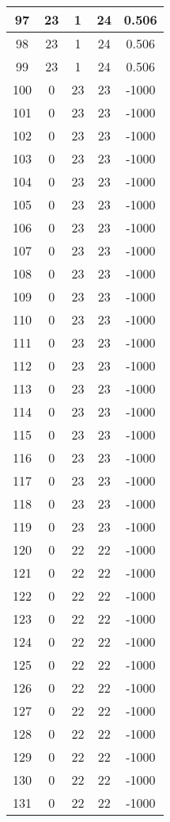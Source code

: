 \documentclass[letterpaper, 12pt]{article}
\begin{document}
\begin{longtable}{|c|c|c|c|c|}
\hline
97 & 23 & 1 & 24 & 0.506 \\
\hline
98 & 23 & 1 & 24 & 0.506 \\
\hline
99 & 23 & 1 & 24 & 0.506 \\
\hline
100 & 0 & 23 & 23 & -1000 \\
\hline
101 & 0 & 23 & 23 & -1000 \\
\hline
102 & 0 & 23 & 23 & -1000 \\
\hline
103 & 0 & 23 & 23 & -1000 \\
\hline
104 & 0 & 23 & 23 & -1000 \\
\hline
105 & 0 & 23 & 23 & -1000 \\
\hline
106 & 0 & 23 & 23 & -1000 \\
\hline
107 & 0 & 23 & 23 & -1000 \\
\hline
108 & 0 & 23 & 23 & -1000 \\
\hline
109 & 0 & 23 & 23 & -1000 \\
\hline
110 & 0 & 23 & 23 & -1000 \\
\hline
111 & 0 & 23 & 23 & -1000 \\
\hline
112 & 0 & 23 & 23 & -1000 \\
\hline
113 & 0 & 23 & 23 & -1000 \\
\hline
114 & 0 & 23 & 23 & -1000 \\
\hline
115 & 0 & 23 & 23 & -1000 \\
\hline
116 & 0 & 23 & 23 & -1000 \\
\hline
117 & 0 & 23 & 23 & -1000 \\
\hline
118 & 0 & 23 & 23 & -1000 \\
\hline
119 & 0 & 23 & 23 & -1000 \\
\hline
120 & 0 & 22 & 22 & -1000 \\
\hline
121 & 0 & 22 & 22 & -1000 \\
\hline
122 & 0 & 22 & 22 & -1000 \\
\hline
123 & 0 & 22 & 22 & -1000 \\
\hline
124 & 0 & 22 & 22 & -1000 \\
\hline
125 & 0 & 22 & 22 & -1000 \\
\hline
126 & 0 & 22 & 22 & -1000 \\
\hline
127 & 0 & 22 & 22 & -1000 \\
\hline
128 & 0 & 22 & 22 & -1000 \\
\hline
129 & 0 & 22 & 22 & -1000 \\
\hline
130 & 0 & 22 & 22 & -1000 \\
\hline
131 & 0 & 22 & 22 & -1000 \\

\end{longtable}
\end{document}
